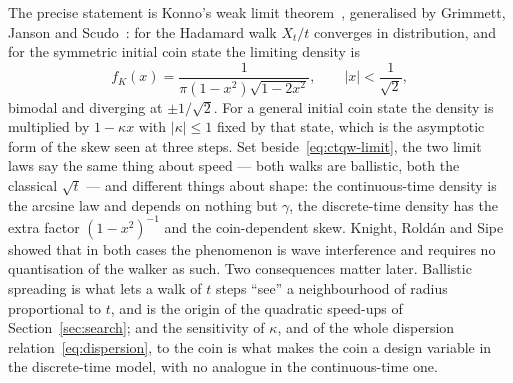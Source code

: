 The precise statement is Konno's weak limit theorem~\cite{Konno_2002},
generalised by Grimmett, Janson and Scudo~\cite{Grimmett_2003}: for the
Hadamard walk $X_t/t$ converges in distribution, and for the symmetric
initial coin state the limiting density is
\begin{equation}
	f_K(x) = \frac{1}{\pi (1 - x^2) \sqrt{1 - 2x^2}}, \qquad |x| < \frac{1}{\sqrt{2}},
	\label{eq:konno}
\end{equation}
bimodal and diverging at $\pm 1/\sqrt{2}$. For a general initial coin state
the density is multiplied by $1 - \kappa x$ with $|\kappa| \le 1$ fixed by
that state, which is the asymptotic form of the skew seen at three steps.
Set beside~\eqref{eq:ctqw-limit}, the two limit laws say the same thing
about speed --- both walks are ballistic, both the classical $\sqrt{t}$ ---
and different things about shape: the continuous-time density is the
arcsine law and depends on nothing but $\gamma$, the discrete-time density
has the extra factor $(1 - x^2)^{-1}$ and the coin-dependent skew. Knight,
Rold\'an and Sipe~\cite{Knight_2003} showed that in both cases the phenomenon
is wave interference and requires no quantisation of the walker as such.
Two consequences matter later. Ballistic spreading is what lets a walk of
$t$ steps ``see'' a neighbourhood of radius proportional to $t$, and is the
origin of the quadratic speed-ups of Section~\ref{sec:search}; and the
sensitivity of $\kappa$, and of the whole dispersion
relation~\eqref{eq:dispersion}, to the coin is what makes the coin a design
variable in the discrete-time model, with no analogue in the continuous-time
one.

